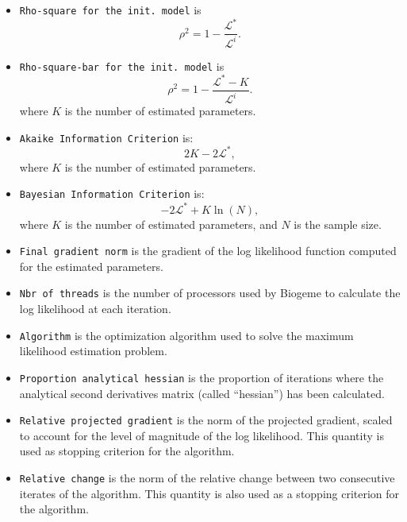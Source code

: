 \documentclass[12pt,a4paper]{article}
\begin{document}
\begin{itemize}
      \item \texttt{Rho-square for the init. model} is
         \begin{equation}
            \rho^2 = 1 - \frac{\mathcal{L}^*}{\mathcal{L}^i}.
         \end{equation}
        \item \texttt{Rho-square-bar for the init. model} is
         \begin{equation}
            \rho^2 = 1 - \frac{\mathcal{L}^* - K}{\mathcal{L}^i}.
         \end{equation}
         where $K$ is the number of estimated parameters.
       \item \texttt{Akaike Information Criterion} is:
         \begin{equation}
          2 K - 2 \mathcal{L}^*,
         \end{equation}
         where $K$ is the number of estimated parameters.
       \item \texttt{Bayesian Information Criterion} is:
         \begin{equation}
 - 2 \mathcal{L}^* + K \ln(N),
         \end{equation}
         where  $K$ is the number of estimated parameters, and $N$ is
         the sample size. 
      \item \texttt{Final gradient norm} is the gradient of the log
        likelihood function computed for the estimated parameters.
      \item \texttt{Nbr of threads} is the number of processors used
        by Biogeme to calculate the log likelihood at each iteration.
       \item \texttt{Algorithm} is the optimization algorithm used to
         solve the maximum likelihood estimation problem.
        \item \texttt{Proportion analytical hessian} is the proportion
          of iterations where the analytical second derivatives matrix
          (called ``hessian'') has been calculated.
         \item \texttt{Relative projected gradient} is the norm of the
           projected gradient, scaled to account for the level of
           magnitude of the log likelihood. This quantity is used as
           stopping criterion for the algorithm.
         \item \texttt{Relative change} is the norm of the relative change between two consecutive iterates of the algorithm. This quantity is also used as a stopping criterion for the algorithm.

\end{itemize}
\end{document}
